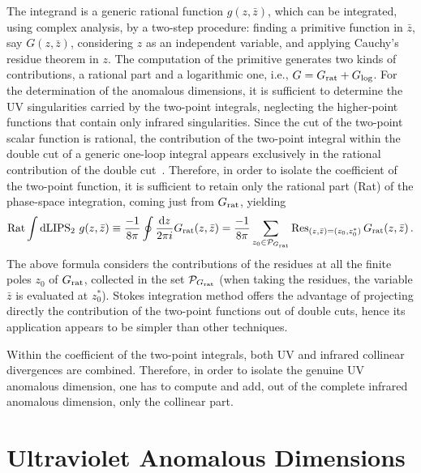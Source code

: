The integrand is a generic rational function $g(z,\bar z)$, which can be integrated, using
complex analysis, by a two-step procedure: finding a primitive function in $\bar z$, say
$G(z,{\bar z})$, considering $z$ as an independent variable, and applying Cauchy's residue
theorem in $z$.
The computation of the primitive generates two kinds of contributions, a rational part and a
logarithmic one, i.e., $G = G_{\rm rat} + G_{\log}$.
For the determination of the anomalous dimensions, it is sufficient to determine the
UV singularities carried by the two-point integrals, neglecting the higher-point
functions that contain only infrared singularities.
Since the cut of the two-point scalar function is rational, the contribution of the two-point
integral within the double cut of a generic one-loop integral appears exclusively in the
rational contribution of the double cut~\cite{Mastrolia:2009dr}.
Therefore, in order to isolate the coefficient of the two-point function, it is sufficient to
retain only the rational part (Rat) of the phase-space integration, coming just from
$G_{\rm rat}$, yielding
    \begin{equation}
        {\rm Rat}\int \text{dLIPS}_2 \ g(z,\bar z)
        \equiv
         \frac{-1}{8 \pi}
         \oint \frac{\text{d}z }{ 2 \pi i}
         G_{\rm rat}(z,{\bar z})
         =
         \frac{-1}{8 \pi}
         \sum_{z_0\in {\cal P}_{G_{\rm rat}}}
         \Res_{(z,\bar z)=(z_0,z_0^*)} G_{\rm rat}(z,\bar z)\, .
         \label{eq:ALPratint}
    \end{equation}
The above formula considers the contributions of the residues at all the finite poles $z_0$ of
$G_{\rm rat}$, collected in the set ${\cal P}_{G_{\rm rat}}$ (when taking the residues, the
variable $\bar z$ is evaluated at $z_0^*$).
Stokes integration method offers the advantage of projecting directly the contribution of the
two-point functions out of double cuts, hence its application appears to be simpler than other
techniques.

Within the coefficient of the two-point integrals, both UV and infrared collinear
divergences are combined.
Therefore, in order to isolate the genuine UV anomalous dimension, one has to compute
and add, out of the complete infrared anomalous dimension, only the collinear part.

\section{Ultraviolet Anomalous Dimensions}
\label{sec:ALPuvanomalousdim}

